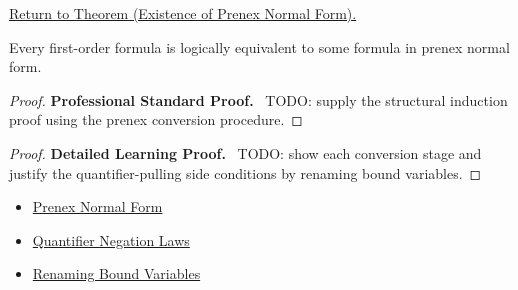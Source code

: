 \newpage
{}
\label{prf:pnf}

\begin{remark*}[Return]
\hyperref[thm:pnf]{Return to Theorem (Existence of Prenex Normal Form).}
\end{remark*}

\begin{theorem*}
Every first-order formula is logically equivalent to some formula in prenex
normal form.
\end{theorem*}

\begin{proof}
\textbf{Professional Standard Proof.}~
TODO: supply the structural induction proof using the prenex conversion
procedure.
\end{proof}

\begin{proof}
\textbf{Detailed Learning Proof.}~
TODO: show each conversion stage and justify the quantifier-pulling side
conditions by renaming bound variables.
\end{proof}

\begin{remark*}
\end{remark*}

\begin{dependencies}
\begin{itemize}
  \item \hyperref[def:pnf]{Prenex Normal Form}
  \item \hyperref[thm:qneg]{Quantifier Negation Laws}
  \item \hyperref[thm:rename]{Renaming Bound Variables}
\end{itemize}
\end{dependencies}

\clearpage
